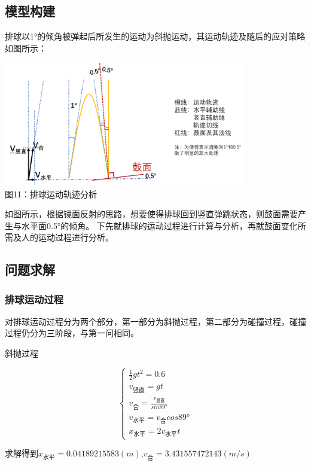 \documentclass[UTF8]{article}
\begin{document}
\subsection{模型构建}
排球以1°的倾角被弹起后所发生的运动为斜抛运动，其运动轨迹及随后的应对策略如图所示：
\begin{center}
    \includegraphics[width=0.8\textwidth]{figure7.png}\\ 
    图11：排球运动轨迹分析  
\end{center}
如图所示，根据镜面反射的思路，想要使得排球回到竖直弹跳状态，则鼓面需要产生与水平面0.5°的倾角。
下先就排球的运动过程进行计算与分析，再就鼓面变化所需及人的运动过程进行分析。

\subsection{问题求解}
\subsubsection{排球运动过程}
对排球运动过程分为两个部分，第一部分为斜抛过程，第二部分为碰撞过程，碰撞过程仍分为三阶段，与第一问相同。\\

\centerline{斜抛过程}

\begin{equation}
    \begin{cases}
        \frac{1}{2}gt^2=0.6\\
        v_{\mbox{竖直}}=gt\\
        v_{\mbox{合}}=\frac{v_{\mbox{竖直}}}{sin89°}\\
        v_{\mbox{水平}}=v_{\mbox{合}}cos89°\\
        x_{\mbox{水平}}=2v_{\mbox{水平}}t
    \end{cases}
\end{equation}

求解得到$x_{\mbox{水平}}=0.04189215583(m)$,$v_{\mbox{合}}=3.431557472143(m/s)$
\end{document}
